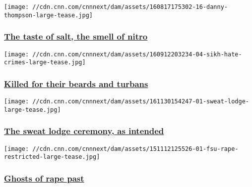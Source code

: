 \href{/2016/08/22/us/danny-thompson-bonneville-speed-record/index.html}{}

\texttt{[image: //cdn.cnn.com/cnnnext/dam/assets/160817175302-16-danny-thompson-large-tease.jpg]}

\hypertarget{the-taste-of-salt-the-smell-of-nitro}{%
\subsubsection{\texorpdfstring{\href{/2016/08/22/us/danny-thompson-bonneville-speed-record/index.html}{The
taste of salt, the smell of
nitro}}{The taste of salt, the smell of nitro}}\label{the-taste-of-salt-the-smell-of-nitro}}

\href{/2016/09/15/us/sikh-hate-crime-victims/index.html}{}

\texttt{[image: //cdn.cnn.com/cnnnext/dam/assets/160912203234-04-sikh-hate-crimes-large-tease.jpg]}

\hypertarget{killed-for-their-beards-and-turbans}{%
\subsubsection{\texorpdfstring{\href{/2016/09/15/us/sikh-hate-crime-victims/index.html}{Killed
for their beards and
turbans}}{Killed for their beards and turbans}}\label{killed-for-their-beards-and-turbans}}

\href{/2016/12/01/us/canada-sweat-lodge/index.html}{}

\texttt{[image: //cdn.cnn.com/cnnnext/dam/assets/161130154247-01-sweat-lodge-large-tease.jpg]}

\hypertarget{the-sweat-lodge-ceremony-as-intended}{%
\subsubsection{\texorpdfstring{\href{/2016/12/01/us/canada-sweat-lodge/index.html}{The
sweat lodge ceremony, as
intended}}{The sweat lodge ceremony, as intended}}\label{the-sweat-lodge-ceremony-as-intended}}

\href{/2015/11/16/us/campus-rape-survivor-faces-ghosts/index.html}{}

\texttt{[image: //cdn.cnn.com/cnnnext/dam/assets/151112125526-01-fsu-rape-restricted-large-tease.jpg]}

\hypertarget{ghosts-of-rape-past}{%
\subsubsection{\texorpdfstring{\href{/2015/11/16/us/campus-rape-survivor-faces-ghosts/index.html}{Ghosts
of rape past}}{Ghosts of rape past}}\label{ghosts-of-rape-past}}

